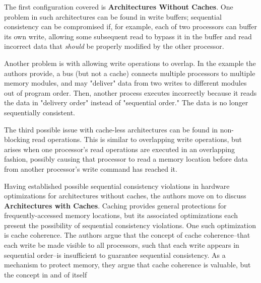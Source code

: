 \documentclass{article}
\begin{document}
\par The first configuration covered is \textbf{Architectures Without Caches}.
One problem in such architectures can be found in write buffers; sequential consistency can be compromised if, for example, each of two processors can buffer its own write, allowing some subsequent read to bypass it in the buffer and read incorrect data that \textit{should} be properly modified by the other processor.

\par Another problem is with allowing write operations to overlap.
In the example the authors provide, a bus (but not a cache) connects multiple processors to multiple memory modules, and may "deliver" data from two writes to different modules out of program order.
Then, another process executes incorrectly because it reads the data in "delivery order" instead of "sequential order."
The data is no longer sequentially consistent.

\par The third possible issue with cache-less architectures can be found in non-blocking read operations.
This is similar to overlapping write operations, but arises when one processor's read operations are executed in an overlapping fashion, possibly causing that processor to read a memory location before data from another processor's write command has reached it.

\par Having established possible sequential consistency violations in hardware optimizations for architectures without caches, the authors move on to discuss \textbf{Architectures with Caches}.
Caching provides general protections for frequently-accessed memory locations, but its associated optimizations each present the possibility of sequential consistency violations.
One such optimization is cache coherence.
The authors argue that the concept of cache coherence--that each write be made visible to all processors, such that each write appears in sequential order--is insufficient to guarantee sequential consistency.
As a mechanism to protect memory, they argue that cache coherence is valuable, but the concept in and of itself 
\end{document}
